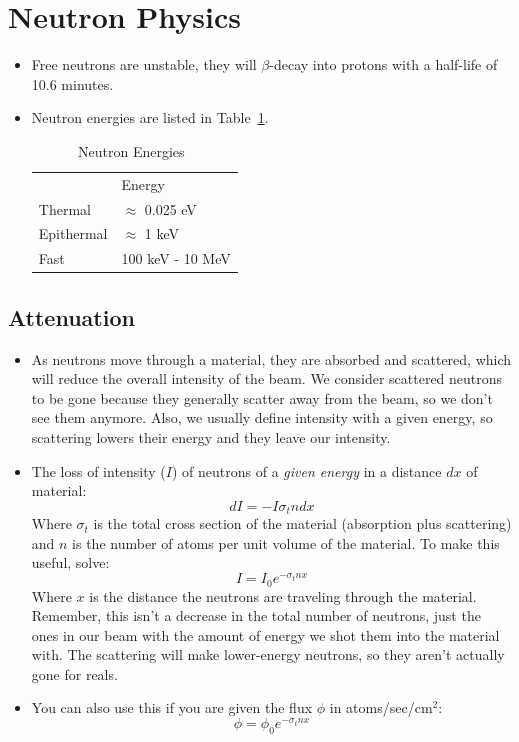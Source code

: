 \documentclass[letter]{article}
\begin{document}
\section{Neutron Physics}
\begin{itemize}
\item Free neutrons are unstable, they will $\beta$-decay into protons
  with a half-life of 10.6 minutes.~\cite[pp. 444]{krane}
\item Neutron energies are listed in
  Table~\ref{tab:neutron_e}.
\begin{table}[hbtp]
\centering
\begin{tabular}{ll}
           & Energy             \\
Thermal    & $\approx$ 0.025 eV \\
Epithermal & $\approx$ 1 keV    \\
Fast       & 100 keV - 10 MeV  
\end{tabular}
\caption{Neutron Energies~\cite[pp.445]{krane}}
\label{tab:neutron_e}
\end{table}
\end{itemize}
\subsection{Attenuation}

\begin{itemize}
\item As neutrons move through a material, they are absorbed and
  scattered, which will reduce the overall intensity of the beam. We
  consider scattered neutrons to be gone because they generally
  scatter away from the beam, so we don't see them anymore. Also, we
  usually define intensity with a given energy, so scattering lowers
  their energy and they leave our intensity.
\item The loss of intensity ($I$) of neutrons of a \textit{given
    energy} in a distance $dx$ of material:
  \begin{equation*}
    dI = -I\sigma_t n dx
  \end{equation*}
Where $\sigma_t$ is the total cross section of the material
(absorption plus scattering) and $n$ is the number of atoms per unit
volume of the material. To make this useful, solve:
\begin{equation*}
  I = I_0e^{-\sigma_tnx}
\end{equation*}
Where $x$ is the distance the neutrons are traveling through the
material. Remember, this isn't a decrease in the total number of
neutrons, just the ones in our beam with the amount of energy we shot
them into the material with. The scattering will make lower-energy
neutrons, so they aren't actually gone for
reals.~\cite[pp. 448]{krane}
\item You can also use this if you are given the flux $\phi$ in
  atoms/sec/cm$^2$:
  \begin{equation*}
    \phi = \phi_0e^{-\sigma_tnx}
  \end{equation*}
\end{itemize}
\end{document}
